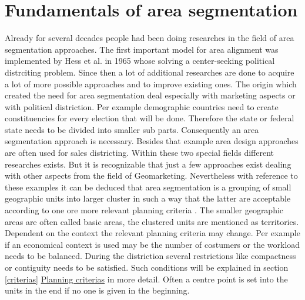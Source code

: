 \section{Fundamentals of area segmentation}\label{Fundamentals}

Already for several decades people had been doing researches in the field of area segmentation approaches. The first important model for area alignment was implemented by Hess et al. in 1965 whose solving a center-seeking political distrciting problem\cite{hess}. Since then a lot of additional researches are done to acquire a lot of more possible approaches and to improve existing ones. The origin which created the need for area segmentation deal especially with marketing aspects or with political distriction. Per example demographic countries need to create constituencies for every election that will be done. Therefore the state or federal state needs to be divided into smaller sub parts. Consequently an area segmentation approach is necessary. Besides that example area design approaches are often used for sales districting. Within these two special fields different researches exists. But it is recognizable that just a few approaches exist dealing with other aspects from the field of Geomarketing. Nevertheless with reference to these examples it can be deduced that area segmentation is a grouping of small geographic units into larger cluster in such a way that the latter are acceptable according to one ore more relevant planning criteria \cite{kalcsics, zoltner}. The smaller geographic areas are often called basic areas, the clustered units are mentioned as territories. Dependent on the context the relevant planning criteria may change. Per example if an economical context is used may be the number of costumers or the workload needs to be balanced. During the distriction several restrictions like compactness or contiguity needs to be satisfied. Such conditions will be explained in section \ref{criterias} \hyperref[criterias]{Planning criterias} in more detail. Often a centre point is set into the units in the end if no one is given in the beginning.\\
